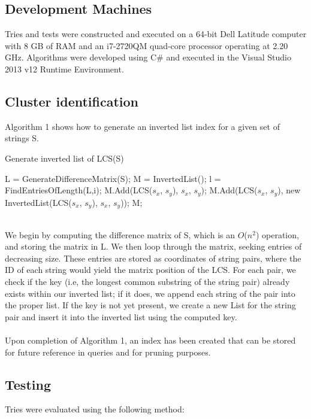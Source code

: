 \documentclass[pdftex,12pt,letter]{article}
\DeclareMathOperator{\length}{length}
\begin{document}
\subsection{Development Machines}
Tries and tests were constructed and executed on a 64-bit Dell Latitude computer with 8 GB of RAM and an i7-2720QM quad-core processor operating at 2.20 GHz. Algorithms were developed using C\# and executed in the Visual Studio 2013 v12 Runtime Environment. 

\subsection{Cluster identification}
Algorithm 1 shows how to generate an inverted list index for a given set of strings S. 
\begin{algorithm}
\caption{Generate inverted list of LCS(S)}
\label{Algorithm 2}
\begin{algorithmic}[1]
\STATE L = GenerateDifferenceMatrix(S);
\STATE M = InvertedList();
\FOR{$i = \max(\length(s_1), ..., \length(s_n))$ \textbf{to} $0$}
\STATE l = FindEntriesOfLength(L,i);
\STATE M.Add(LCS($s_x$, $s_y$), $s_x$, $s_y$);
\ELSE
\STATE M.Add(LCS($s_x$, $s_y$), new InvertedList(LCS($s_x$, $s_y$), $s_x$, $s_y$));
\ENDIF
\ENDFOR
\ENDFOR
\RETURN M;
\end{algorithmic}
\end{algorithm}
\\
We begin by computing the difference matrix of S, which is an $O$($n^2$) operation, and storing the matrix in L. We then loop through the matrix, seeking entries of decreasing size. These entries are stored as coordinates of string pairs, where the ID of each string would yield the matrix position of the LCS. For each pair, we check if the key (i.e, the longest common substring of the string pair) already exists within our inverted list; if it does, we append each string of the pair into the proper list. If the key is not yet present, we create a new List for the string pair and insert it into the inverted list using the computed key.\\
\\
Upon completion of Algorithm 1, an index has been created that can be stored for future reference in queries and for pruning purposes.

\subsection{Testing}
Tries were evaluated using the following method:
\end{document}
